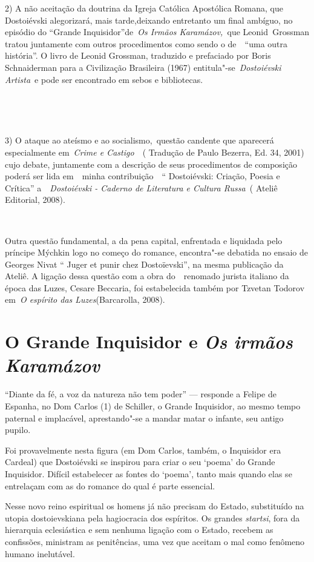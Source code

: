 2) A não aceitação da doutrina da Igreja Católica Apostólica Romana, que
Dostoiévski alegorizará, mais tarde,deixando entretanto um final
ambíguo, no episódio do ``Grande Inquisidor''de~\emph{Os Irmãos
Karamázov,~}que Leonid\emph{~}Grossman tratou juntamente com outros
procedimentos como sendo o de~~``uma outra história''. O livro de Leonid
Grossman, traduzido e prefaciado por Boris Schnaiderman para a
Civilização Brasileira (1967) entitula"-se~\emph{Dostoiévski Artista}~e
pode ser encontrado em sebos e bibliotecas.

~

\emph{~}

3) O ataque ao ateísmo e ao socialismo,~questão candente que aparecerá
especialmente em~\emph{Crime e Castigo}~~( Tradução de Paulo Bezerra,
Ed. 34, 2001) cujo debate, juntamente com a descrição de seus
procedimentos de composição poderá ser lida em~~minha contribuição~~``
Dostoiévski: Criação, Poesia e Crítica'' a~~\emph{Dostoiévski - Caderno
de Literatura e Cultura Russa~}( Ateliê Editorial, 2008).

~

Outra questão fundamental, a da pena capital, enfrentada e liquidada
pelo príncipe Mýchkin logo no começo do romance, encontra"-se debatida no
ensaio de Georges Nivat `` Juger et punir chez Dostoïevski'', na mesma
publicação da Ateliê. A ligação dessa questão com a obra do~~renomado
jurista italiano da época das Luzes, Cesare Beccaria, foi estabelecida
também por Tzvetan Todorov em~\emph{O espírito das Luzes}(Barcarolla,
2008).

\chapter{O Grande Inquisidor e \emph{Os irmãos Karamázov}}

``Diante da fé, a voz da natureza não tem poder'' --- responde a Felipe
de Espanha, no Dom Carlos (1) de Schiller, o Grande Inquisidor, ao mesmo
tempo paternal e implacável, aprestando"-se a mandar matar o infante, seu
antigo pupilo.

Foi provavelmente nesta figura (em Dom Carlos, também, o Inquisidor era
Cardeal) que Dostoiévski se inspirou para criar o seu `poema' do Grande
Inquisidor. Difícil estabelecer as fontes do `poema', tanto mais quando
elas se entrelaçam com as do romance do qual é parte essencial.

Nesse novo reino espiritual os homens já não precisam do Estado,
substituído na utopia dostoievskiana pela hagiocracia dos espíritos. Os
grandes \emph{startsi}, fora da hierarquia eclesiástica e sem nenhuma
ligação com o Estado, recebem as confissões, ministram as penitências,
uma vez que aceitam o mal como fenômeno humano inelutável.


